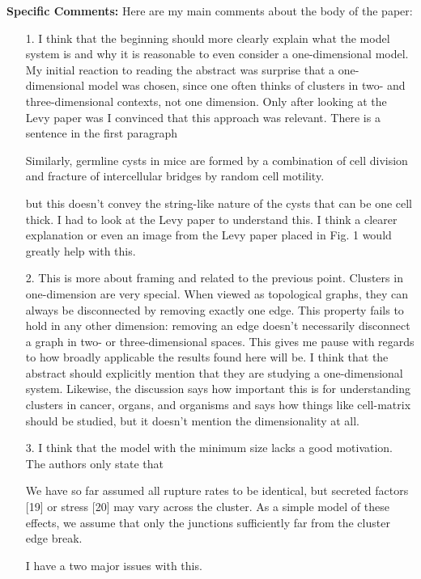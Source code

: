 \documentclass[12pt,oneside,letterpaper]{article}
\begin{document}
\textbf{Specific Comments:} Here are my main comments about the body of the paper:
\begin{itemize}
	\item[1.] I think that the beginning should more clearly explain what the model system is and why it is reasonable to even consider a one-dimensional model. My initial reaction to reading the abstract was surprise that a one-dimensional model was chosen, since one often thinks of clusters in two- and three-dimensional contexts, not one dimension. Only after looking at the Levy paper was I convinced that this approach was relevant. There is a sentence in the first paragraph
	\begin{displayquote}
		Similarly, germline cysts in mice are formed by a combination of cell division and fracture of intercellular bridges by random cell motility.
	\end{displayquote}
	but this doesn't convey the string-like nature of the cysts that can be one cell thick. I had to look at the Levy paper to understand this. I think a clearer explanation or even an image from the Levy paper placed in Fig. 1 would greatly help with this.
	
	\item[2.] This is more about framing and related to the previous point. Clusters in one-dimension are very special. When viewed as topological graphs, they can always be disconnected by removing exactly one edge. This property fails to hold in any other dimension: removing an edge doesn't necessarily disconnect a graph in two- or three-dimensional spaces. This gives me pause with regards to how broadly applicable the results found here will be. I think that the abstract should explicitly mention that they are studying a one-dimensional system. Likewise, the discussion says how important this is for understanding clusters in cancer, organs, and organisms and says how things like cell-matrix should be studied, but it doesn't mention the dimensionality at all. 
	
	\item[3.] I think that the model with the minimum size lacks a good motivation. The authors only state that
	\begin{displayquote}
		We have so far assumed all rupture rates to be identical, but secreted factors [19] or stress [20] may vary across the cluster. As a simple model of these effects, we assume that only the junctions sufficiently far from the
		cluster edge break.
	\end{displayquote}
	I have a two major issues with this. 
	

\end{itemize}
\end{document}
